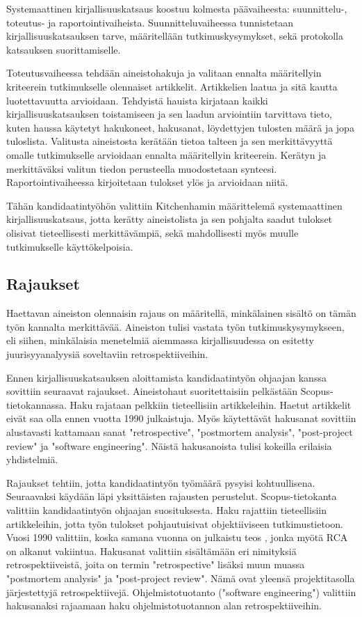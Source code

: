 Systemaattinen kirjallisuuskatsaus koostuu kolmesta päävaiheesta: suunnittelu-, toteutus- ja raportointivaiheista. Suunnitteluvaiheessa tunnistetaan kirjallisuuskatsauksen tarve, määritellään tutkimuskysymykset, sekä protokolla katsauksen suorittamiselle. \citep{Kitchenham2007}

Toteutusvaiheessa tehdään aineistohakuja ja valitaan ennalta määritellyin kriteerein tutkimukselle olennaiset artikkelit. Artikkelien laatua ja sitä kautta luotettavuutta arvioidaan. Tehdyistä hauista kirjataan kaikki kirjallisuuskatsauksen toistamiseen ja sen laadun arviointiin tarvittava tieto, kuten haussa käytetyt hakukoneet, hakusanat, löydettyjen tulosten määrä ja jopa tuloslista. Valitusta aineistosta kerätään tietoa talteen ja sen merkittävyyttä omalle tutkimukselle arvioidaan ennalta määritellyin kriteerein. Kerätyn ja merkittäväksi valitun tiedon perusteella muodostetaan synteesi. Raportointivaiheessa kirjoitetaan tulokset ylös ja arvioidaan niitä. \citep{Kitchenham2007}

Tähän kandidaatintyöhön valittiin Kitchenhamin määrittelemä systemaattinen kirjallisuuskatsaus, jotta kerätty aineistolista ja sen pohjalta saadut tulokset olisivat tieteellisesti merkittävämpiä, sekä mahdollisesti myös muulle tutkimukselle käyttökelpoisia.

\subsection{Rajaukset}
Haettavan aineiston olennaisin rajaus on määritellä, minkälainen sisältö on tämän työn kannalta merkittävää. Aineiston tulisi vastata työn tutkimuskysymykseen, eli siihen, minkälaisia menetelmiä aiemmassa kirjallisuudessa on esitetty juurisyyanalyysiä soveltaviin retrospektiiveihin.

Ennen kirjallisuuskatsauksen aloittamista kandidaatintyön ohjaajan kanssa sovittiin seuraavat rajaukset. Aineistohaut suoritettaisiin pelkästään Scopus-tietokannassa. Haku rajataan pelkkiin tieteellisiin artikkeleihin. Haetut artikkelit eivät saa olla ennen vuotta 1990 julkaistuja. Myös käytettävät hakusanat sovittiin alustavasti kattamaan sanat "retrospective",  "postmortem analysis", "post-project review" ja "software engineering". Näistä hakusanoista tulisi kokeilla erilaisia yhdistelmiä.

Rajaukset tehtiin, jotta kandidaatintyön työmäärä pysyisi kohtuullisena. Seuraavaksi käydään läpi yksittäisten rajausten perustelut. Scopus-tietokanta valittiin kandidaatintyön ohjaajan suosituksesta. Haku rajattiin tieteellisiin artikkeleihin, jotta työn tulokset pohjautuisivat objektiiviseen tutkimustietoon. Vuosi 1990 valittiin, koska samana vuonna on julkaistu teos \citep{ishikawa1990introduction}, jonka myötä RCA on alkanut vakiintua. Hakusanat valittiin sisältämään eri nimityksiä retrospektiiveistä, joita on termin "retrospective" lisäksi muun muassa "postmortem analysis" ja "post-project review". Nämä ovat yleensä projektitasolla järjestettyjä retrospektiivejä. Ohjelmistotuotanto ("software engineering") valittiin hakusanaksi rajaamaan haku ohjelmistotuotannon alan retrospektiiveihin.

